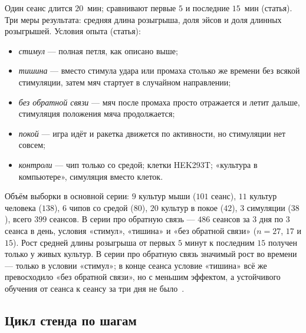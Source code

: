 Один сеанс длится $20$~мин; сравнивают первые $5$ и последние $15$~мин (статья). Три меры результата: средняя длина розыгрыша, доля эйсов и доля длинных розыгрышей. Условия опыта (статья):
\begin{itemize}
\item \emph{стимул} --- полная петля, как описано выше;
\item \emph{тишина} --- вместо стимула удара или промаха столько же времени без всякой стимуляции, затем мяч стартует в случайном направлении;
\item \emph{без обратной связи} --- мяч после промаха просто отражается и летит дальше, стимуляция положения мяча продолжается;
\item \emph{покой} --- игра идёт и ракетка движется по активности, но стимуляции нет совсем;
\item \emph{контроли} --- чип только со средой; клетки HEK293T; «культура в компьютере», симуляция вместо клеток.
\end{itemize}
Объём выборки в основной серии: $9$ культур мыши ($101$ сеанс), $11$ культур человека ($138$), $6$ чипов со средой ($80$), $20$ культур в покое ($42$), $3$ симуляции ($38$), всего $399$ сеансов. В серии про обратную связь --- $486$ сеансов за $3$ дня по $3$ сеанса в день, условия «стимул», «тишина» и «без обратной связи» ($n=27$, $17$ и $15$). Рост средней длины розыгрыша от первых $5$ минут к последним $15$ получен только у живых культур. В серии про обратную связь значимый рост во времени --- только в условии «стимул»; в конце сеанса условие «тишина» всё же превосходило «без обратной связи», но с меньшим эффектом, а устойчивого обучения от сеанса к сеансу за три дня не было~\cite{Kagan2022}.

\subsection*{Цикл стенда по шагам}

